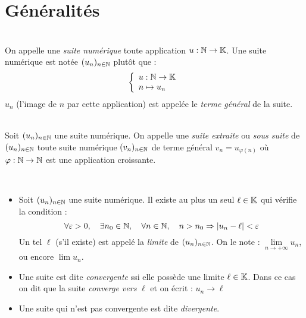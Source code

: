 \section{Généralités}
    \begin{definition}
        \ \\
        On appelle une \emph{suite numérique} toute application \(u:\mathbb{N} \rightarrow \mathbb{K}\).
        Une suite numérique est notée \((u_n)_{n \in \mathbb{N}}\) plutôt que :
        \[
            \left\{
                \begin{array}{l}
                    u: \mathbb{N} \rightarrow \mathbb{K}\\
                    n \mapsto u_n
                \end{array}
            \right.    
        \]
        \(u_n\) (l'image de \(n\) par cette application) est appelée le \emph{terme général} de la suite.
    \end{definition}

    \begin{definition}
        \ \\
        Soit \((u_n)_{n\in\mathbb{N}}\) une suite numérique. On appelle une \emph{suite extraite} ou \emph{sous suite} de \((u_n)_{n\in\mathbb{N}}\) toute suite numérique \((v_n)_{n\in\mathbb{N}}\) de terme général \(v_n = u_{\varphi(n)}\) où \(\varphi: \mathbb{N} \rightarrow \mathbb{N}\) est une application croissante.
    \end{definition}
    
    \begin{thedef}
        \ \\
        \label{definition:limite_suite}
        \begin{itemize}
            \item Soit \((u_n)_{n\in\mathbb{N}}\) une suite numérique. Il existe au plus un seul \(\ell\in\mathbb{K}\) qui vérifie la condition :
            \[
                \forall \varepsilon > 0, \quad \exists n_0 \in \mathbb{N}, \quad \forall n \in \mathbb{N}, \quad n > n_0 \Rightarrow |u_n - \ell| < \varepsilon    
            \]
            Un tel \(\ell\) (s'il existe) est appelé la \emph{limite} de \((u_n)_{n\in\mathbb{N}}\). On le note :  \(\lim\limits_{n\to+\infty}u_n\), ou encore \(\lim u_n\).
            \item Une suite est dite \emph{convergente} ssi elle possède une limite \(\ell \in \mathbb{K}\). Dans ce cas on dit que la suite \emph{converge vers} \(\ell\) et on écrit : \(u_n \to\ell \)
            \item Une suite qui n'est pas convergente est dite \emph{divergente}.
        \end{itemize}
    \end{thedef}

